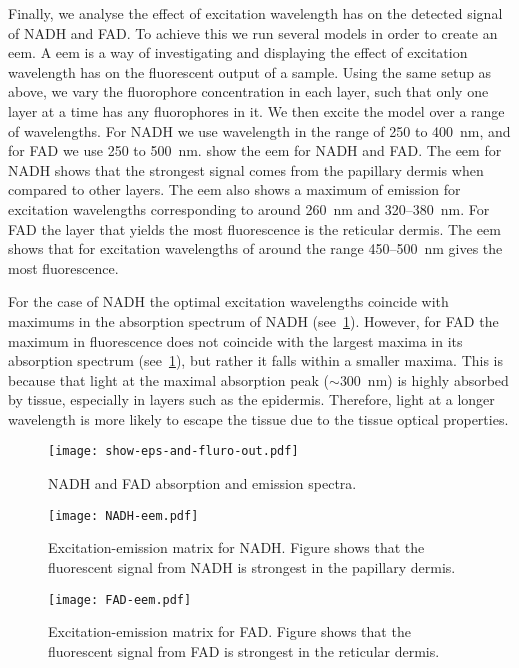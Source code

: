 Finally, we analyse the effect of excitation wavelength has on the detected signal of NADH and FAD\@.
To achieve this we run several models in order to create an \gls*{eem}.
A \gls*{eem} is a way of investigating and displaying the effect of excitation wavelength has on the fluorescent output of a sample.
Using the same setup as above, we vary the fluorophore concentration in each layer, such that only one layer at a time has any fluorophores in it.
We then excite the model over a range of wavelengths.
For NADH we use wavelength in the range of 250 to 400~nm, and for FAD we use 250 to 500~nm.
 show the \gls*{eem} for NADH and FAD\@.
The \gls*{eem} for NADH shows that the strongest signal comes from the papillary dermis when compared to other layers.
The \gls*{eem} also shows a maximum of emission for excitation wavelengths corresponding to around 260~nm and 320--380~nm.
For FAD the layer that yields the most fluorescence is the reticular dermis.
The \gls*{eem} shows that for excitation wavelengths of around the range 450--500~nm gives the most fluorescence.

For the case of NADH the optimal excitation wavelengths coincide with maximums in the absorption spectrum of NADH (see~\cref{fig:epsfluro}).
However, for FAD the maximum in fluorescence does not coincide with the largest maxima in its absorption spectrum (see~\cref{fig:epsfluro}), but rather it falls within a smaller maxima.
This is because that light at the maximal absorption peak ($\sim$300~nm) is highly absorbed by tissue, especially in layers such as the epidermis.
Therefore, light at a longer wavelength is more likely to escape the tissue due to the tissue optical properties.

\begin{figure}[!htpb]
    \centering
    \texttt{[image: show-eps-and-fluro-out.pdf]}
    \caption{NADH and FAD absorption and emission spectra.}
    \label{fig:epsfluro}
\end{figure}

\begin{figure}[!htpb]
    \centering
    \texttt{[image: NADH-eem.pdf]}
    \caption{Excitation-emission matrix for NADH. Figure shows that the fluorescent signal from NADH is strongest in the papillary dermis.}
    \label{fig:nadheem}
\end{figure}

\begin{figure}[!htpb]
    \centering
    \texttt{[image: FAD-eem.pdf]}
    \caption{Excitation-emission matrix for FAD. Figure shows that the fluorescent signal from FAD is strongest in the reticular dermis.}
    \label{fig:fadeem}
\end{figure}

